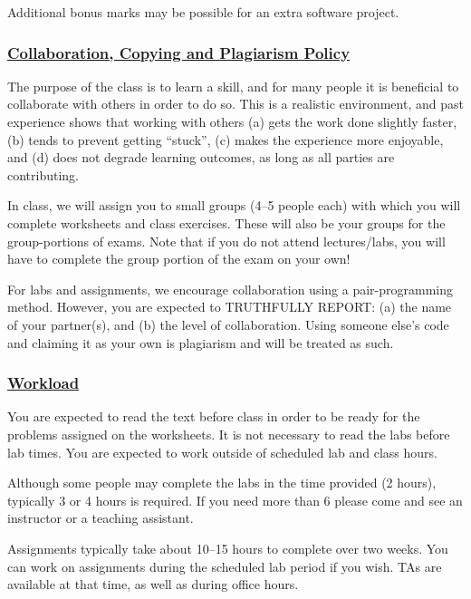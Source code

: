 \documentclass[12pt]{article}
\renewcommand{\section}[1]{\vspace{0pt}\subsubsection*{\underline{\large #1}}\vspace{-10pt}}
\begin{document}
Additional bonus marks may be possible for an extra software project.

\newpage
\section{Collaboration, Copying and Plagiarism Policy}

The purpose of the class is to learn a skill, and for many people it is beneficial
to collaborate with others in order to do so. This is a realistic environment, and past experience shows that working
with others (a) gets the work done slightly faster, (b) tends to prevent getting ``stuck'',
(c) makes the experience more enjoyable, and (d) does not degrade learning outcomes, as
long as all parties are contributing.  

In class, we will assign you to small groups (4--5 people each) with which you will complete worksheets and class exercises. These will also be your groups for the group-portions of exams. Note that if you do not attend lectures/labs, you will have to complete the group portion of the exam on your own!

For labs and assignments, we encourage collaboration using a pair-programming method. However, you are expected to TRUTHFULLY REPORT: (a) the name of 
your partner(s), and (b) the level of collaboration. Using someone else's code and claiming it as your own is plagiarism and will be treated as such. 
 
\section{Workload}

You are expected to read the text before class in order to be ready for the problems assigned on the worksheets. 
It is not necessary to read the labs before lab times. You are expected to work outside of scheduled lab and class hours. 

Although some people
may complete the labs in the time provided (2 hours), typically 3 or 4 hours is required.
If you need more than 6 please come and see an instructor or a teaching assistant.
 
Assignments typically take about 10--15 hours to complete over two weeks. You can work on assignments during the scheduled lab period if you wish. TAs are available at that time, as well as during office hours.
\end{document}
